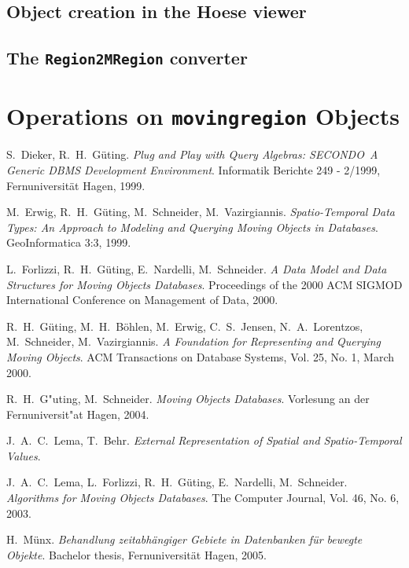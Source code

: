 \documentclass[a4paper,12pt]{article}
\newcommand{\secondo}{{\scshape SE\-CON\-DO}}
\begin{document}
\subsection{Object creation in the Hoese viewer}

\subsection{The {\tt Region2MRegion} converter}

\section{Operations on {\tt movingregion} Objects}
\label{operations}

\begin{thebibliography}{\hspace{2cm}}

  S.\ Dieker, R.\ H.\ G\"{u}ting.
  \textsl{Plug and Play with Query Algebras: \secondo\ A Generic DBMS
    Development Environment}.
  Informatik Berichte 249 - 2/1999, Fernuniversit\"{a}t Hagen, 1999.

  M.\ Erwig, R.\ H.\ G\"{u}ting, M.\ Schneider, M.\ Vazirgiannis.
  \textsl{Spatio-Temporal Data Types: An Approach to Modeling and
    Querying Moving Objects in Databases}.
  GeoInformatica 3:3, 1999.

  L.\ Forlizzi, R.\ H.\ G\"{u}ting, E.\ Nardelli, M.\ Schneider.
  \textsl{A Data Model and Data Structures for Moving Objects Databases}.
  Proceedings of the 2000 ACM SIGMOD International Conference on Management
  of Data, 2000.
  
  R.\ H.\ G\"{u}ting, M.\ H.\ B\"{o}hlen, M.\ Erwig, C.\ S.\ Jensen,
  N.\ A.\ Lorentzos, M.\ Schneider, M.\ Vazirgiannis.
  \textsl{A Foundation for Representing and Querying Moving Objects}.
  ACM Transactions on Database Systems, Vol. 25, No. 1, March 2000.

  R.\ H.\ G"uting, M.\ Schneider.
  \textsl{Moving Objects Databases}.
  Vorlesung an der Fernuniversit"at Hagen, 2004.

  J.\ A.\ C.\ Lema, T.\ Behr.
  \textsl{External Representation of Spatial and Spatio-Temporal Values}.

  J.\ A.\ C.\ Lema, L.\ Forlizzi, R.\ H.\ G\"{u}ting, E.\ Nardelli,
  M.\ Schneider.
  \textsl{Algorithms for Moving Objects Databases}.
  The Computer Journal, Vol. 46, No. 6, 2003.

  H.\ M\"{u}nx.
  \textsl{Behandlung zeitabh\"{a}ngiger Gebiete in Datenbanken
    f\"{u}r bewegte Objekte}.
  Bachelor thesis, Fernuniversit\"{a}t Hagen, 2005.

\end{thebibliography}
\end{document}
